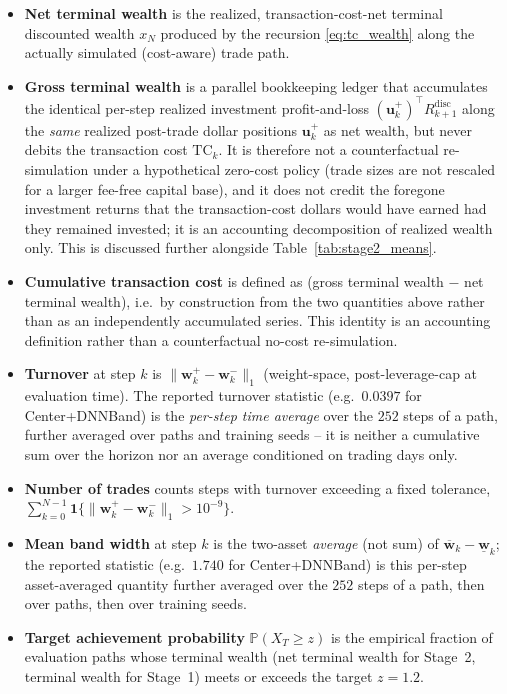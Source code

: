\documentclass[a4paper,10pt]{article}
\newcommand{\Pbb}{\mathbb{P}}
\newcommand{\bu}{\bm{u}}
\newcommand{\bw}{\bm{w}}
\begin{document}
\begin{itemize}
\item \textbf{Net terminal wealth} is the realized, transaction-cost-net terminal discounted wealth $x_N$ produced by the recursion \eqref{eq:tc_wealth} along the actually simulated (cost-aware) trade path.
\item \textbf{Gross terminal wealth} is a parallel bookkeeping ledger that accumulates the identical per-step realized investment profit-and-loss $(\bu_k^+)^\top R_{k+1}^{\mathrm{disc}}$ along the \emph{same} realized post-trade dollar positions $\bu_k^+$ as net wealth, but never debits the transaction cost $\mathrm{TC}_k$. It is therefore not a counterfactual re-simulation under a hypothetical zero-cost policy (trade sizes are not rescaled for a larger fee-free capital base), and it does not credit the foregone investment returns that the transaction-cost dollars would have earned had they remained invested; it is an accounting decomposition of realized wealth only. This is discussed further alongside Table~\ref{tab:stage2_means}.
\item \textbf{Cumulative transaction cost} is defined as (gross terminal wealth $-$ net terminal wealth), i.e.\ by construction from the two quantities above rather than as an independently accumulated series. This identity is an accounting definition rather than a counterfactual no-cost re-simulation.
\item \textbf{Turnover} at step $k$ is $\|\bw_k^+-\bw_k^-\|_1$ (weight-space, post-leverage-cap at evaluation time). The reported turnover statistic (e.g.\ $0.0397$ for Center+DNNBand) is the \emph{per-step time average} over the $252$ steps of a path, further averaged over paths and training seeds -- it is neither a cumulative sum over the horizon nor an average conditioned on trading days only.
\item \textbf{Number of trades} counts steps with turnover exceeding a fixed tolerance, $\sum_{k=0}^{N-1}\bm 1\{\|\bw_k^+-\bw_k^-\|_1>10^{-9}\}$.
\item \textbf{Mean band width} at step $k$ is the two-asset \emph{average} (not sum) of $\overline{\bw}_k-\underline{\bw}_k$; the reported statistic (e.g.\ $1.740$ for Center+DNNBand) is this per-step asset-averaged quantity further averaged over the $252$ steps of a path, then over paths, then over training seeds.
\item \textbf{Target achievement probability} $\Pbb(X_T\ge z)$ is the empirical fraction of evaluation paths whose terminal wealth (net terminal wealth for Stage~2, terminal wealth for Stage~1) meets or exceeds the target $z=1.2$.
\end{itemize}
\end{document}
